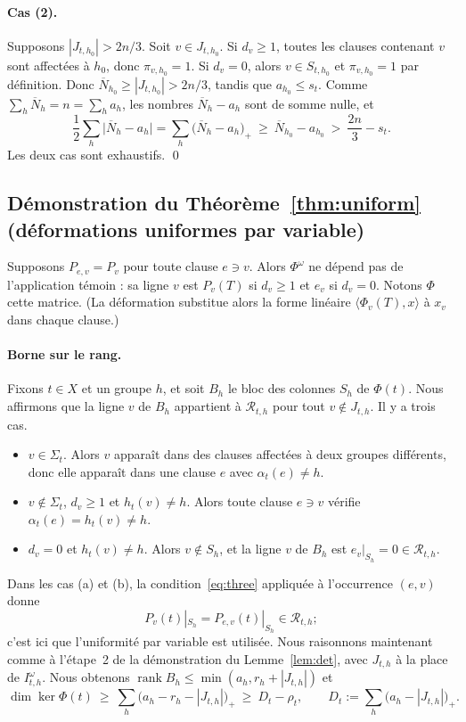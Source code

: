 \documentclass[11pt,a4paper]{article}
\theoremstyle{definition}
\theoremstyle{remark}
\newcommand{\cR}{\mathcal{R}}
\newcommand{\rank}{\operatorname{rank}}
\newcommand{\Nbar}{\overline{N}}
\begin{document}
\paragraph{Cas (2).} Supposons $|J_{t,h_0}|>2n/3$. Soit $v\in J_{t,h_0}$. Si $d_v\ge1$,
toutes les clauses contenant $v$ sont affectées à $h_0$, donc $\pi_{v,h_0}=1$. Si $d_v=0$,
alors $v\in S_{t,h_0}$ et $\pi_{v,h_0}=1$ par définition. Donc
$\Nbar_{h_0}\ge|J_{t,h_0}|>2n/3$, tandis que $a_{h_0}\le s_t$. Comme
$\sum_h\Nbar_h=n=\sum_ha_h$, les nombres $\Nbar_h-a_h$ sont de somme nulle, et
\[
\frac12\sum_h\bigl|\Nbar_h-a_h\bigr|=\sum_h\bigl(\Nbar_h-a_h\bigr)_+\ \ge\ \Nbar_{h_0}-a_{h_0}
\ >\ \frac{2n}{3}-s_t .
\]
Les deux cas sont exhaustifs. \qed

\subsection{Démonstration du Théorème~\ref{thm:uniform} (déformations uniformes par variable)}

Supposons $P_{e,v}=P_v$ pour toute clause $e\ni v$. Alors $\Phi^\omega$ ne dépend pas de
l'application témoin : sa ligne $v$ est $P_v(T)$ si $d_v\ge1$ et $e_v$ si $d_v=0$. Notons
$\Phi$ cette matrice. (La déformation substitue alors la forme linéaire
$\langle\Phi_v(T),x\rangle$ à $x_v$ dans chaque clause.)

\paragraph{Borne sur le rang.} Fixons $t\in X$ et un groupe $h$, et soit $B_h$ le bloc des
colonnes $S_h$ de $\Phi(t)$. Nous affirmons que la ligne $v$ de $B_h$ appartient à
$\cR_{t,h}$ pour tout $v\notin J_{t,h}$. Il y a trois cas.
\begin{itemize}
\item[(a)] $v\in\Sigma_t$. Alors $v$ apparaît dans des clauses affectées à deux groupes
 différents, donc elle apparaît dans une clause $e$ avec $\alpha_t(e)\ne h$.
\item[(b)] $v\notin\Sigma_t$, $d_v\ge1$ et $h_t(v)\ne h$. Alors toute clause $e\ni v$
 vérifie $\alpha_t(e)=h_t(v)\ne h$.
\item[(c)] $d_v=0$ et $h_t(v)\ne h$. Alors $v\notin S_h$, et la ligne $v$ de $B_h$ est
 $e_v|_{S_h}=0\in\cR_{t,h}$.
\end{itemize}
Dans les cas (a) et (b), la condition~\eqref{eq:three} appliquée à l'occurrence $(e,v)$
donne
\[
P_v(t)|_{S_h}=P_{e,v}(t)|_{S_h}\in\cR_{t,h};
\]
c'est ici que l'uniformité par variable est utilisée. Nous raisonnons maintenant comme à
l'étape~2 de la démonstration du Lemme~\ref{lem:det}, avec $J_{t,h}$ à la place de
$I^\omega_{t,h}$. Nous obtenons $\rank B_h\le\min(a_h,r_h+|J_{t,h}|)$ et
\begin{equation}\label{eq:Dt}
\dim\ker\Phi(t)\ \ge\ \sum_h\bigl(a_h-r_h-|J_{t,h}|\bigr)_+\ \ge\ D_t-\rho_t,
\qquad D_t:=\sum_h\bigl(a_h-|J_{t,h}|\bigr)_+ .
\end{equation}
\end{document}

